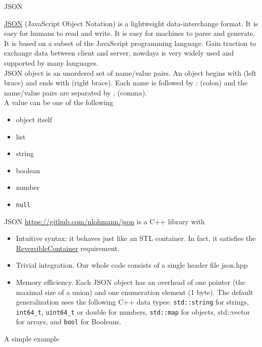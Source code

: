 \documentclass[10pt,aspectratio=169]{beamer}
\begin{document}
\begin{frame}{JSON}

\href{https://www.json.org/json-en.html}{JSON} (JavaScript Object Notation) is a lightweight data-interchange format. It is easy for humans to read and write. It is easy for machines to parse and generate. It is based on a subset of the JavaScript programming language. Gain traction to exchange data between client and server, nowdays is very widely used and supported by many languages.\\[0.5cm]

JSON object is an unordered set of name/value pairs. An object begins with { (left brace) and ends with } (right brace). Each name is followed by : (colon) and the name/value pairs are separated by , (comma).\\[0.5cm]

A value can be one of the following
\begin{multicols}{2}
\begin{itemize}
\item object itself
\item list
\item string
\item boolean
\item number 
\item \texttt{null}
\end{itemize}
\end{multicols}

\end{frame}

\begin{frame}{JSON}
\url{https://github.com/nlohmann/json} is a C++ library with 
\begin{itemize}
    \item Intuitive syntax: it behaves just like an STL container. In fact, it satisfies the \href{https://en.cppreference.com/w/cpp/named_req/ReversibleContainer}{ReversibleContainer} requirement.
    \item Trivial integration. Our whole code consists of a single header file json.hpp
    \item Memory efficiency. Each JSON object has an overhead of one pointer (the maximal size of a union) and one enumeration element (1 byte). The default generalization uses the following C++ data types: \texttt{std::string} for strings, \texttt{int64\_t}, \texttt{uint64\_t} or double for numbers, \texttt{std::map} for objects, std::vector for arrays, and \texttt{bool} for Booleans.
\end{itemize}

\end{frame}

\begin{frame}[fragile]{A simple example}        
    
\end{frame}
\end{document}
